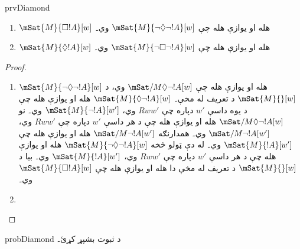 \documentclass[../../../include/open-logic-section]{subfiles}
\begin{document}
\begin{tagblock}{prvDiamond}
\begin{prop}
  \begin{enumerate}
  \item $\mSat{M}{\Box !A}[w]$ هله او يوازې هله چې $\mSat{M}{\lnot\Diamond\lnot !A}[w]$ وي۔
  \item $\mSat{M}{\Diamond !A}[w]$ هله او يوازې هله چې $\mSat{M}{\lnot\Box\lnot !A}[w]$ وي۔
  \end{enumerate}
\end{prop}

\begin{proof}
  \begin{enumerate}
    \item $\mSat{M}{\lnot\Diamond\lnot !A}[w]$ هله او يوازې هله چې $\mSat/{M}{\Diamond\lnot
      !A}[w]$ وي، د $\mSat{M}{}[w]$ د تعريف له مخې۔ $\mSat{M}{\Diamond\lnot
      !A}[w]$ هله او يوازې هله چې د يوه داسې $w'$ دپاره چې $Rww'$ وي، $\mSat{M}{\lnot
      !A}[w']$ وي۔ نو $\mSat/{M}{\Diamond\lnot !A}[w]$ هله او يوازې هله چې د هر
    داسې $w'$ دپاره چې $Rww'$ وي، $\mSat/{M}{\lnot !A}[w']$ وي۔ همدارنګه
    $\mSat/{M}{\lnot !A}[w']$ هله او يوازې هله چې $\mSat{M}{!A}[w']$ وي۔
    له دې ټولو څخه $\mSat{M}{\lnot\Diamond\lnot !A}[w]$ هله او يوازې هله
    چې د هر داسې $w'$ دپاره چې $Rww'$ وي، $\mSat{M}{!A}[w']$ وي۔ بيا د
    $\mSat{M}{}[w]$ د تعريف له مخې دا هله او يوازې هله چې
      $\mSat{M}{\Box !A}[w]$ وي۔
    \item {}
  \end{enumerate}
\end{proof}

\begin{probtag}{probDiamond}
  د  ثبوت بشپړ کړئ۔
\end{probtag}
\end{tagblock}
\end{document}
